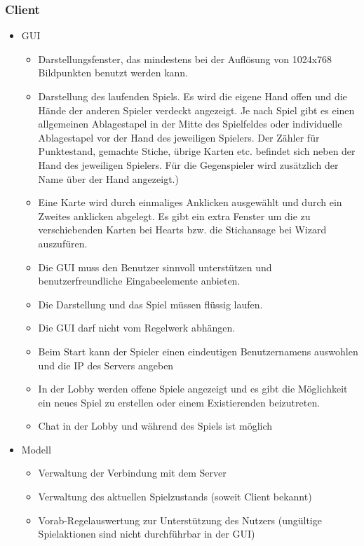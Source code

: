 \documentclass{article}
\begin{document}
\subsubsection{\gls{Client}}
\begin{itemize}
	\item GUI
	\begin{itemize}
		\item Darstellungsfenster, das mindestens bei der Auflösung von 1024x768 Bildpunkten benutzt werden kann.
		\item Darstellung des laufenden Spiels. Es wird die eigene Hand offen und die Hände der anderen Spieler verdeckt 					angezeigt. Je nach Spiel gibt es einen allgemeinen Ablagestapel in der Mitte des Spielfeldes oder individuelle 					Ablagestapel vor der Hand des jeweiligen Spielers. Der Zähler für Punktestand, gemachte Stiche, übrige Karten 					etc. befindet sich neben  der Hand des jeweiligen Spielers. Für die Gegenspieler wird zusätzlich der Name über 					der Hand angezeigt.)
		\item Eine Karte wird durch einmaliges Anklicken ausgewählt und durch ein Zweites anklicken abgelegt. Es gibt ein extra 					Fenster um die zu verschiebenden Karten bei Hearts bzw. die Stichansage bei Wizard auszufüren.
		\item Die GUI muss den Benutzer sinnvoll unterstützen und benutzerfreundliche Eingabeelemente anbieten.
		\item Die Darstellung und das Spiel müssen flüssig laufen.
		\item Die GUI darf nicht vom \gls{Regelwerk} abhängen.
		\item Beim Start kann der Spieler einen eindeutigen Benutzernamens auswohlen und die IP des \gls{Server}s angeben
		\item In der \gls{Lobby} werden offene Spiele angezeigt und es gibt die Möglichkeit ein neues Spiel zu erstellen oder 					einem Existierenden beizutreten.
		\item Chat in der \gls{Lobby} und während des Spiels ist möglich
	\end{itemize}
	\item Modell
	\begin{itemize}
		\item Verwaltung der Verbindung mit dem \gls{Server}
		\item Verwaltung des aktuellen Spielzustands (soweit \gls{Client} bekannt)
		\item Vorab-Regelauswertung zur Unterstützung des Nutzers (ungültige Spielaktionen sind nicht durchführbar in der 					GUI)
	\end{itemize}
\end{itemize}
\end{document}
